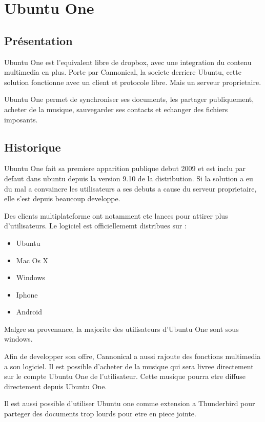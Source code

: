 \section{Ubuntu One}
\thispagestyle{EIP} %
\subsection{Présentation}
Ubuntu One est l'equivalent libre de dropbox, avec une integration du contenu multimedia en plus. Porte par Cannonical, la societe derriere Ubuntu, cette solution fonctionne avec un client et protocole libre. Mais un serveur proprietaire.

Ubuntu One permet de synchroniser ses documents, les partager publiquement, acheter de la musique, sauvegarder ses contacts et echanger des fichiers imposants.

\subsection{Historique}
Ubuntu One fait sa premiere apparition publique debut 2009 et est inclu par defaut dans ubuntu depuis la version 9.10 de la distribution. Si la solution a eu du mal a convaincre les utilisateurs a ses debuts a cause du serveur proprietaire, elle s'est depuis beaucoup developpe.

Des clients multiplateforme ont notamment ete lances pour attirer plus d'utilisateurs. Le logiciel est officiellememt distribues sur :

\begin{itemize}
\renewcommand{\labelitemi}{$\bullet$}
\item Ubuntu
\item Mac Os X
\item Windows
\item Iphone
\item Android
\end{itemize}

Malgre sa provenance, la majorite des utilisateurs d'Ubuntu One sont sous windows.

Afin de developper son offre, Cannonical a aussi rajoute des fonctions multimedia a son logiciel. Il est possible d'acheter de la musique qui sera livree directement sur le compte Ubuntu One de l'utilisateur. Cette musique pourra etre diffuse directement depuis Ubuntu One.

Il est aussi possible d'utiliser Ubuntu one comme extension a Thunderbird pour parteger des documents trop lourds pour etre en piece jointe.

